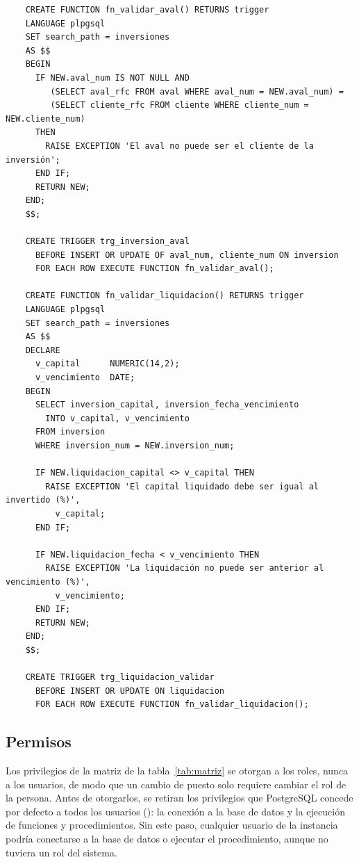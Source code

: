 \begin{verbatim}
	CREATE FUNCTION fn_validar_aval() RETURNS trigger
	LANGUAGE plpgsql
	SET search_path = inversiones
	AS $$
	BEGIN
	  IF NEW.aval_num IS NOT NULL AND
	     (SELECT aval_rfc FROM aval WHERE aval_num = NEW.aval_num) =
	     (SELECT cliente_rfc FROM cliente WHERE cliente_num = NEW.cliente_num)
	  THEN
	    RAISE EXCEPTION 'El aval no puede ser el cliente de la inversión';
	  END IF;
	  RETURN NEW;
	END;
	$$;

	CREATE TRIGGER trg_inversion_aval
	  BEFORE INSERT OR UPDATE OF aval_num, cliente_num ON inversion
	  FOR EACH ROW EXECUTE FUNCTION fn_validar_aval();

	CREATE FUNCTION fn_validar_liquidacion() RETURNS trigger
	LANGUAGE plpgsql
	SET search_path = inversiones
	AS $$
	DECLARE
	  v_capital      NUMERIC(14,2);
	  v_vencimiento  DATE;
	BEGIN
	  SELECT inversion_capital, inversion_fecha_vencimiento
	    INTO v_capital, v_vencimiento
	  FROM inversion
	  WHERE inversion_num = NEW.inversion_num;

	  IF NEW.liquidacion_capital <> v_capital THEN
	    RAISE EXCEPTION 'El capital liquidado debe ser igual al invertido (%)',
	      v_capital;
	  END IF;

	  IF NEW.liquidacion_fecha < v_vencimiento THEN
	    RAISE EXCEPTION 'La liquidación no puede ser anterior al vencimiento (%)',
	      v_vencimiento;
	  END IF;
	  RETURN NEW;
	END;
	$$;

	CREATE TRIGGER trg_liquidacion_validar
	  BEFORE INSERT OR UPDATE ON liquidacion
	  FOR EACH ROW EXECUTE FUNCTION fn_validar_liquidacion();
\end{verbatim}

\subsection{Permisos}

Los privilegios de la matriz de la tabla~\ref{tab:matriz} se otorgan a los roles, nunca a los usuarios, de modo que un cambio de puesto solo requiere cambiar el rol de la persona. Antes de otorgarlos, se retiran los privilegios que PostgreSQL concede por defecto a todos los usuarios (): la conexión a la base de datos y la ejecución de funciones y procedimientos. Sin este paso, cualquier usuario de la instancia podría conectarse a la base de datos o ejecutar el procedimiento, aunque no tuviera un rol del sistema.

